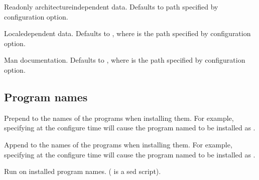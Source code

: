 \documentclass[letterpaper,10pt,english]{sphinxmanual}
\begin{document}
\begin{description}
\sphinxAtStartPar
Read\sphinxhyphen{}only architecture\sphinxhyphen{}independent data.  Defaults to path
specified by \sphinxstylestrong{\sphinxhyphen{}} configuration option.

\sphinxAtStartPar
Locale\sphinxhyphen{}dependent data.  Defaults to , where
 is the path specified by \sphinxstylestrong{\sphinxhyphen{}}
configuration option.

\sphinxAtStartPar
Man documentation.  Defaults to , where
 is the path specified by \sphinxstylestrong{\sphinxhyphen{}}
configuration option.

\end{description}


\subsection{Program names}
\label{\detokenize{build/options2configure:program-names}}\begin{description}
\sphinxAtStartPar
Prepend  to the names of the programs when installing
them. For example, specifying  at the
configure time will cause the program named  to be
installed as .

\sphinxAtStartPar
Append  to the names of the programs when installing them.
For example, specifying  at the configure
time will cause the program named  to be installed as
.

\sphinxAtStartPar
Run  on installed program names. ( is a
sed script).

\end{description}
\end{document}

